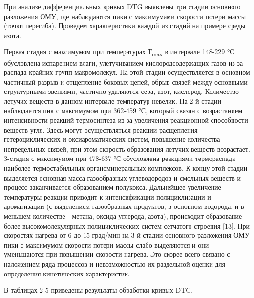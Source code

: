 \begin{multicols}{2}
При анализе дифференциальных кривых DTG выявлены три стадии основного
разложения ОМУ, где наблюдаются пики с максимумами скорости потери массы
(точки перегиба). Проведем характеристики каждой из стадий на примере
среды азота.

Первая стадия с максимумом при температурах Т\textsubscript{max} в
интервале 148-229 °С обусловлена испарением влаги, улетучиванием
кислородсодержащих газов из-за распада крайних групп макромолекул. На
этой стадии осуществляется в основном частичный разрыв и отщепление
боковых цепей, обрыв связей между основными структурными звеньями,
частично удаляются сера, азот, кислород. Количество летучих веществ в
данном интервале температур невелик. На 2-й стадии наблюдается пик с
максимумом при 362-459 °С, который связан с возрастанием интенсивности
реакций термосинтеза из-за увеличения реакционной способности веществ
угля. Здесь могут осуществляться реакции расщепления гетероциклических и
оксиароматических систем, повышение количества непредельных связей, при
этом скорость образования летучих веществ возрастает.\\
3-стадия с максимумом при 478-637 °С обусловлена реакциями термораспада
наиболее термостабильных органоминеральных комплексов. К концу этой
стадии выделяется основная масса газообразных углеводородов и смольных
веществ и процесс заканчивается образованием полукокса. Дальнейшее
увеличение температуры реакции приводит к интенсификации полициклизации
и ароматизации (с выделением газообразных продуктов, в основном
водорода, и в меньшем количестве - метана, оксида углерода, азота),
происходит образование более высокомолекулярных полициклических систем
сетчатого строения {[}13{]}. При скоростях нагрева от 6 до 15 град/мин
на 3-й стадии основного разложения ОМУ пики с максимумом скорости потери
массы слабо выделяются и они уменьшаются при повышении скорости нагрева.
Это скорее всего связано с наложением ряда процессов и невозможностью их
раздельной оценки для определения кинетических характеристик.

В таблицах 2-5 приведены результаты обработки кривых DTG.
\end{multicols}


